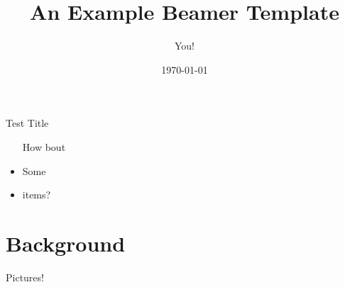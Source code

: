 \documentclass{beamer}
\title[Bottom-right title]{An Example Beamer Template}
\author{You!}
\institute{Colorado School of Mines, probably}
\date{\today}
\begin{document}
\begin{frame}
\titlepage
\end{frame}

 \begin{frame}{Test Title}
\begin{itemize}
\item[How] bout
\item Some
\item items?
\end{itemize}
\end{frame}

\section{Background}
\begin{frame}{Pictures!}
\begin{minipage}{\linewidth}
\\
\end{minipage}
\end{frame}
\end{document}
